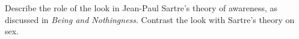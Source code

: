 \needspace{2cm}
\question[5] Describe the role of the look in Jean-Paul Sartre's theory of awareness, as discussed in \textit{Being and Nothingness}.
Contrast the look with Sartre's theory on sex.
\vspace{6cm}
